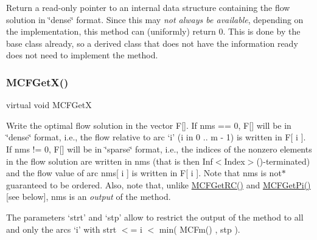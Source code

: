 Return a read-\/only pointer to an internal data structure containing the flow solution in \char`\"{}dense\char`\"{} format. Since this may {\itshape not always be available}, depending on the implementation, this method can (uniformly) return 0. This is done by the base class already, so a derived class that does not have the information ready does not need to implement the method. \mbox{\label{class_m_c_f_cplex_a884f1180138ddf3df909347b1c85428c}} 
\subsubsection{\texorpdfstring{M\+C\+F\+Get\+X()}{MCFGetX()}\hspace{0.1cm}{\footnotesize\ttfamily [2/3]}}
{\footnotesize\ttfamily virtual void M\+C\+F\+GetX}

Write the optimal flow solution in the vector F\mbox{[}\mbox{]}. If nms == 0, F\mbox{[}\mbox{]} will be in \char`\"{}dense\char`\"{} format, i.\+e., the flow relative to arc `i' (i in 0 .. m -\/ 1) is written in F\mbox{[} i \mbox{]}. If nms != 0, F\mbox{[}\mbox{]} will be in \char`\"{}sparse\char`\"{} format, i.\+e., the indices of the nonzero elements in the flow solution are written in nms (that is then Inf$<$\+Index$>$()-\/terminated) and the flow value of arc nms\mbox{[} i \mbox{]} is written in F\mbox{[} i \mbox{]}. Note that nms is not$\ast$ guaranteed to be ordered. Also, note that, unlike \mbox{\hyperlink{class_m_c_f_class_af027cee8179a876a4879c73820c380d1}{M\+C\+F\+Get\+R\+C()}} and \mbox{\hyperlink{class_m_c_f_class_a8f1a95d5c707f83ffc6aecba1e7e0e10}{M\+C\+F\+Get\+Pi()}} \mbox{[}see below\mbox{]}, nms is an {\itshape output} of the method.

The parameters `strt' and `stp' allow to restrict the output of the method to all and only the arcs `i' with strt $<$= i $<$ min( M\+C\+Fm() , stp ). \mbox{\label{class_m_c_f_cplex_adfe83485d41648441446726b336069d1}} 
